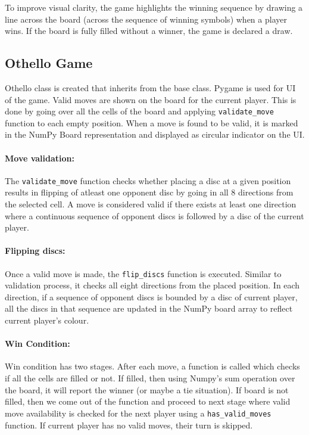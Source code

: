 \documentclass[12pt,a4paper]{article}
\begin{document}
To improve visual clarity, the game highlights the winning sequence by drawing a line across the board (across the sequence of winning symbols) when a player wins. If the board is fully filled without a winner, the game is declared a draw.


\subsection{Othello Game}
Othello class is created that inherits from the base class. Pygame is used for UI of the game. Valid moves are shown on the board for the current player. This is done by going over all the cells of the board and applying \texttt{validate\_move} function to each empty position. When a move is found to be valid, it is marked in the NumPy Board representation and displayed as circular indicator on the UI.
\paragraph{Move validation:}
The \texttt{validate\_move} function checks whether placing a disc at a given position results in flipping of atleast one opponent disc by going in all 8 directions from the selected cell. A move is considered valid if there exists at least one direction where a continuous sequence of opponent discs is followed by a disc of the current player.
\paragraph{Flipping discs:}
Once a valid move is made, the \texttt{flip\_discs} function is executed. Similar to validation process, it checks all eight directions from the placed position. In each direction, if a sequence of opponent discs is bounded by a disc of current player, all the discs in that sequence are updated in the NumPy board array to reflect current player's colour.

\paragraph{Win Condition:}
Win condition has two stages. After each move, a function is called which checks if all the cells are filled or not. If filled, then using Numpy's sum operation over the board, it will report the winner (or maybe a tie situation). If board is not filled, then we come out of the function and proceed to next stage where valid move availability is checked for the next player using a \texttt{has\_valid\_moves} function. If current player has no valid moves, their turn is skipped.
\end{document}
